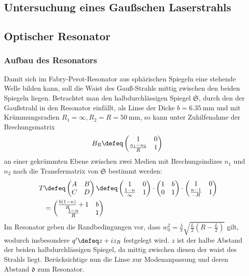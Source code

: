 \documentclass[11pt,a4paper,oneside]{scrartcl}
\begin{document}
\subsection{Untersuchung eines Gaußschen Laserstrahls}
\subsection{Optischer Resonator}
\subsubsection{Aufbau des Resonators}
Damit sich im Fabry-Perot-Resonator aus sphärischen Spiegeln eine stehende Welle bilden kann, soll die Waist des Gauß-Strahls mittig zwischen den beiden Spiegeln liegen. Betrachtet man den halbdurchlässigen Spiegel $\mathfrak{S}$, durch den der Gaußstrahl in den Resonator einfällt, als Linse der Dicke $b=6.35\ \mathrm{mm}$ und mit Krümmungsradien $R_1=\infty,R_2=R=50\ \mathrm{mm}$, so kann unter Zuhilfenahme der Brechungsmatrix 
\begin{align}
B_R\defeq \begin{pmatrix}
1 & 0\\
\frac{n_1-n_2}{R} &1 
\end{pmatrix} 
\end{align}
an einer gekrümmten Ebene zwischen zwei Medien mit Brechungsindizes $n_1$ und $n_2$
nach \cite[Gl. 9.42c]{demtröder_2} die Transfermatrix von $\mathfrak{S}$ bestimmt werden:
\begin{align}
T & \defeq
\begin{pmatrix}
A & B\\
C & D 
\end{pmatrix} \defeq \begin{pmatrix}
1 & 0\\
\frac{1-n}{\infty} &1 
\end{pmatrix} 
\cdot
\begin{pmatrix}
1 & b\\
0 & 1
\end{pmatrix} 
\cdot
\begin{pmatrix}
1 & 0\\
\frac{n-1}{-R} &1 
\end{pmatrix} 
\\ \quad& = \begin{pmatrix}
\frac{b(1-n)}{R}+1 & b\\
\frac{1-n}{R} & 1
\end{pmatrix}
\end{align}
Im Resonator geben die Randbedingungen vor, dass $w_0^2=\frac{\lambda}{\pi}\sqrt{\frac{L}{2}\left(R-\frac{L}{2}\right)}$ gilt, wodurch insbesondere $q^\prime\defeq z+iz_R$ festgelegt wird. $z$ ist der halbe Abstand der beiden halbdurchlässigen Spiegel, da mittig zwischen diesen der waist des Strahls liegt. Berücksichtige nun die Linse zur Modenanpassung und deren Abstand $\mathfrak{d}$ zum Resonator.
\end{document}
